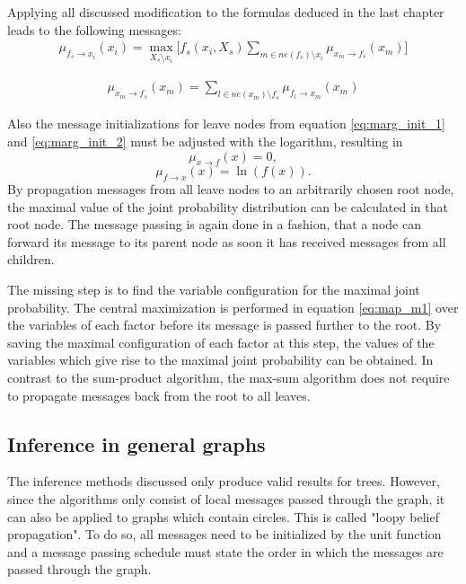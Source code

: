 \documentclass{sigkdd}
\begin{document}
Applying all discussed modification to the formulas deduced in the last chapter leads to the following messages:
\begin{equation}\label{eq:map_m1}
\begin{split}
\mu_{f_s \rightarrow x_i}(x_i) = \max_{X_s \setminus x_i} \Big[f_s(x_i, X_s) \sum_{m \in ne(f_s) \setminus x_i} \mu_{x_m \rightarrow f_s}(x_m) \Big]
\end{split}
\end{equation}

\begin{equation}\label{eq:map_m2}
\begin{split}
\mu_{x_m \rightarrow f_s}(x_m) = \sum_{l \in ne(x_m) \setminus f_s} \mu_{f_l \rightarrow x_m}(x_m)
\end{split}
\end{equation}

Also the message initializations for leave nodes from equation \ref{eq:marg_init_1} and \ref{eq:marg_init_2} must be adjusted with the logarithm, resulting in
\begin{equation}\label{eq:marg_init_1}
\mu_{x \rightarrow f}(x) = 0,
\end{equation}
\begin{equation}\label{eq:marg_init_2}
\mu_{f \rightarrow x}(x) = \ln(f(x)).
\end{equation}
By propagation messages from all leave nodes to an arbitrarily chosen root node, the maximal value of the joint probability distribution can be calculated in that root node. The message passing is again done in a fashion, that a node can forward its message to its parent node as soon it has received messages from all children.

The missing step is to find the variable configuration for the maximal joint probability. The central maximization is performed in equation \ref{eq:map_m1} over the variables of each factor before its message is passed further to the root. By saving the maximal configuration of each factor at this step, the values of the variables which give rise to the maximal joint probability can be obtained. In contrast to the sum-product algorithm, the max-sum algorithm does not require to propagate messages back from the root to all leaves.

\subsection{Inference in general graphs}
The inference methods discussed only produce valid results for trees. However, since the algorithms only consist of local messages passed through the graph, it can also be applied to graphs which contain circles. This is called "loopy belief propagation". To do so, all messages need to be initialized by the unit function and a message passing schedule must state the order in which the messages are passed through the graph.
\end{document}
